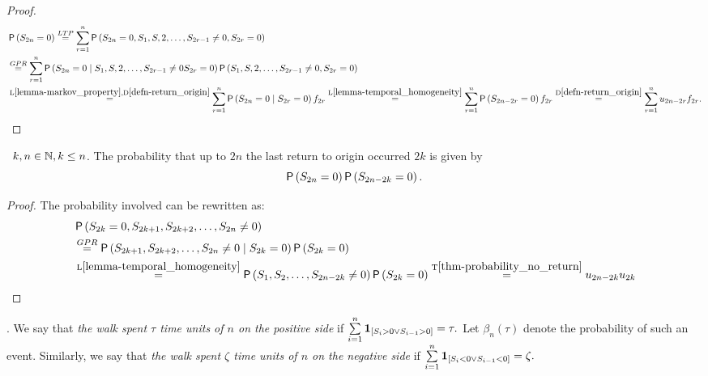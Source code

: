 \begin{proof}
  \[
    \begin{split}
      & \pr \left(S_{2n}=0\right)
      \ltp \suma[r][1][n] \pr \left(S_{2n}=0,S_1, S,2, \ldots, S_{2r-1}\neq 0, S_{2r}=0\right)\\
      & \gpr \suma[r][1][n] \pr \left(S_{2n}=0 \Mid S_1, S,2, \ldots, S_{2r-1}\neq 0 S_{2r}=0\right)\pr \left(S_1, S,2, \ldots, S_{2r-1}\neq 0, S_{2r}=0\right)\\
      & \overset{\text{L}\ref{lemma-markov_property} \text{,D}\ref{defn-return_origin}}{=}\suma[r][1][n] \pr \left(S_{2n}=0 \Mid S_{2r}=0\right) f_{2r}
      \overset{\text{L}\ref{lemma-temporal_homogeneity}}{=}\suma[r][1][n]
      \pr \left(S_{2n-2r}=0\right) f_{2r}\overset{\text{D}\ref{defn-return_origin}}{=}
      \suma[r][1][n] u_{2n-2r}f_{2r}.
    \end{split}
  \]
\end{proof}
\begin{thm}\label{thm-arcsine_last_visits}
 \Lrws\ $k,n \in \mathbb{N}, k\leq n$.
 The probability that up to \Time $2n$ the last return to origin occurred \intime $2k$ is given by
\[
\operatorname{\mathsf{P}}\left( S_{2n}=0\right)\operatorname{\mathsf{P}}\left( S_{2n-2k}=0\right).
\]
\end{thm}
\begin{proof}
 The probability involved can be rewritten as:
 \[
  \begin{split}
    & \operatorname{\mathsf{P}} \left(S_{2k}=0, S_{2k+1}, S_{2k+2}, \ldots, S_{2n} \neq 0\right)\\
    & \overset{GPR}{=} \operatorname{\mathsf{P}} \left( S_{2k+1}, S_{2k+2}, \ldots, S_{2n}\neq 0\mid S_{2k}=0 \right) \operatorname{\mathsf{P}} \left( S_{2k}=0 \right)\\
    & \overset{\text{L}\ref{lemma-temporal_homogeneity}}{=}\operatorname{\mathsf{P}} \left( S_{1}, S_{2}, \ldots, S_{2n-2k}\neq 0 \right) \operatorname{\mathsf{P}} \left( S_{2k}=0 \right)
    \overset{\text{T}\ref{thm-probability_no_return}}{=}u_{2n-2k}u_{2k}
  \end{split}
\]
\end{proof}
\begin{defn}\label{defn-time_spent_positive_side}

 \Lrw. We say that \emph{the walk spent $\tau$ time units of $n$ on the positive side} if $\suma \indikator{S_i>0 \lor S_{i-1}>0}=\tau.$
 Let $\beta_{n} \left( \tau \right) $ denote the probability of such an event.
 Similarly, we say that \emph{the walk spent $\zeta$ time units of $n$ on the negative side} if
 $\suma\indikator{S_i<0 \lor S_{i-1}<0}=\zeta.$
\end{defn}


